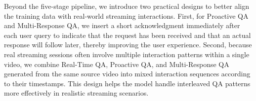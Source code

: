 Beyond the five-stage pipeline, we introduce two practical designs to better align the training data with real-world streaming interactions. First, for Proactive QA and Multi-Response QA, we insert a short acknowledgment immediately after each user query to indicate that the request has been received and that an actual response will follow later, thereby improving the user experience. Second, because real streaming sessions often involve multiple interaction patterns within a single video, we combine Real-Time QA, Proactive QA, and Multi-Response QA generated from the same source video into mixed interaction sequences according to their timestamps. This design helps the model handle interleaved QA patterns more effectively in realistic streaming scenarios.























































